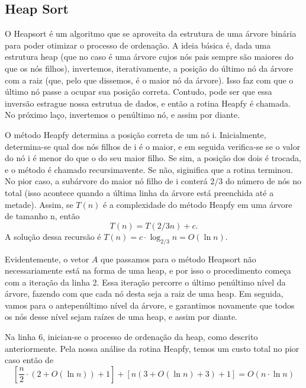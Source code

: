 \documentclass{article}
\begin{document}
\subsection{Heap Sort}
O Heapsort é um algoritmo que se aproveita da estrutura de uma árvore binária para poder otimizar o processo de ordenação. A ideia básica é, dada uma estrutura heap (que no caso é uma árvore cujos nós pais sempre são maiores do que os nós filhos), invertemos, iterativamente, a posição do último nó da árvore com a raiz (que, pelo que dissemos, é o maior nó da árvore). Isso faz com que o último nó passe a ocupar sua posição correta. Contudo, pode ser que essa inversão estrague nossa estrutua de dados, e então a rotina Heapfy é chamada. No próximo laço, invertemos o penúltimo nó, e assim por diante.\par
%
O método Heapfy determina a posição correta de um nó i. Inicialmente, determina-se qual dos nós filhos de i é o maior, e em seguida verifica-se se o valor do nó i é menor do que o do seu maior filho. Se sim, a posição dos dois é trocada, e o método é chamado recursimavente. Se não, siginifica que a rotina terminou. No pior caso, a subárvore do maior nó filho de i conterá $2/3$ do número de nós no total (isso acontece quando a última linha da árvore está preenchida até a metade). Assim, se $T(n)$ é a complexidade do método Heapfy em uma árvore de tamanho n, então \[T(n) = T(2/3n) + c.\]
A solução dessa recursão é $T(n) = c \cdot \log_{2/3}n = O(\ln n).$\par
Evidentemente, o vetor $A$ que passamos para o método Heapsort não necessariamente está na forma de uma heap, e por isso o procedimento começa com a iteração da linha 2. Essa iteração percorre o último penúltimo nível da árvore, fazendo com que cada nó desta seja a raiz de uma heap. Em seguida, vamos para o antepenúltimo nível da árvore, e garantimos novamente que todos os nós desse nível sejam raízes de uma heap, e assim por diante.\par
Na linha 6, inician-se o processo de ordenação da heap, como descrito anteriormente. Pela nossa análise da rotina Heapfy, temos um custo total no pior caso então de \[\left[\frac{n}{2}\cdot(2+O(\ln n)) + 1\right]+ \left[n(3 + O(\ln n) + 3) + 1\right] = O(n\cdot \ln n)\]
\end{document}
